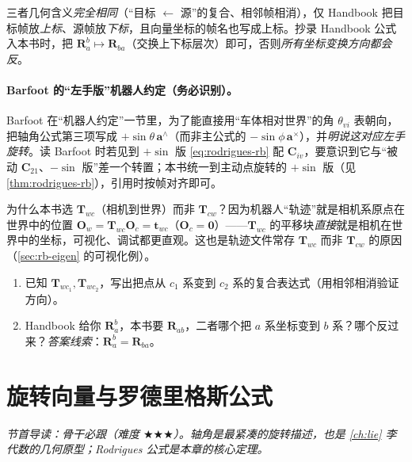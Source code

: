 \noindent 三者几何含义\emph{完全相同}（“目标 $\leftarrow$ 源”的复合、相邻帧相消），仅 Handbook 把目标帧放\emph{上标}、源帧放\emph{下标}，且向量坐标的帧名也写成上标。抄录 Handbook 公式入本书时，把 $\mathbf{R}_a^b\mapsto\mathbf{R}_{ba}$（交换上下标层次）即可，否则\emph{所有坐标变换方向都会反}。

\paragraph{Barfoot 的“左手版”机器人约定（务必识别）。}Barfoot 在“机器人约定”一节里，为了能直接用“车体相对世界”的角 $\theta_{vi}$ 表朝向，把轴角公式第三项写成 $+\sin\theta\,\mathbf{a}^\wedge$（而非主公式的 $-\sin\phi\,\mathbf{a}^\times$），并\emph{明说这对应左手旋转}\cite{barfoot2024state}。读 Barfoot 时若见到 $+\sin$ 版 \cref{eq:rodrigues-rb} 配 $\mathbf{C}_{iv}$，要意识到它与“被动 $\mathbf{C}_{21}$、$-\sin$ 版”差一个转置；本书统一到主动点旋转的 $+\sin$ 版（见 \cref{thm:rodrigues-rb}），引用时按帧对齐即可。

\begin{insight}
为什么本书选 $\mathbf{T}_{wc}$（相机到世界）而非 $\mathbf{T}_{cw}$？因为机器人“轨迹”就是相机系原点在世界中的位置 $\mathbf{O}_w=\mathbf{T}_{wc}\mathbf{O}_c=\mathbf{t}_{wc}$（$\mathbf{O}_c=\mathbf{0}$）——$\mathbf{T}_{wc}$ 的平移块\emph{直接}就是相机在世界中的坐标，可视化、调试都更直观\cite{gaoxiang2019slam14}。这也是轨迹文件常存 $\mathbf{T}_{wc}$ 而非 $\mathbf{T}_{cw}$ 的原因（\cref{sec:rb-eigen} 的可视化例）。
\end{insight}

\begin{practice}
\begin{enumerate}
  \item 已知 $\mathbf{T}_{wc_1},\mathbf{T}_{wc_2}$，写出把点从 $c_1$ 系变到 $c_2$ 系的复合表达式（用相邻相消验证方向）。
  \item Handbook 给你 $\mathbf{R}_a^b$，本书要 $\mathbf{R}_{ab}$，二者哪个把 $a$ 系坐标变到 $b$ 系？哪个反过来？\emph{答案线索}：$\mathbf{R}_a^b=\mathbf{R}_{ba}$。
\end{enumerate}
\end{practice}

\section{旋转向量与罗德里格斯公式}
\label{sec:rb-axisangle}
\noindent\emph{节首导读：骨干必跟（难度 $\bigstar\bigstar\bigstar$）。轴角是最紧凑的旋转描述，也是 \cref{ch:lie} 李代数的几何原型；Rodrigues 公式是本章的核心定理。}


